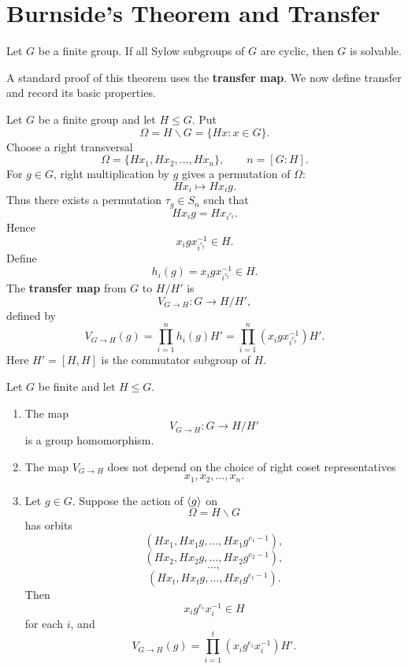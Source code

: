 \section{Burnside's Theorem and Transfer}

\begin{theorem}[Burnside]
Let $G$ be a finite group. If all Sylow subgroups of $G$ are cyclic, then $G$ is solvable.
\end{theorem}

\begin{remark}
A standard proof of this theorem uses the \textbf{transfer map}. We now define transfer and record its basic properties.
\end{remark}

\begin{definition}[Transfer]
Let $G$ be a finite group and let $H\leq G$. Put
\[
    \Omega=H\backslash G=\{Hx:x\in G\}.
\]
Choose a right transversal
\[
    \Omega=\{Hx_1,Hx_2,\ldots,Hx_n\},
    \qquad
    n=[G:H].
\]
For $g\in G$, right multiplication by $g$ gives a permutation of $\Omega$:
\[
    Hx_i\longmapsto Hx_i g.
\]
Thus there exists a permutation $\tau_g\in S_n$ such that
\[
    Hx_i g=Hx_{i^{\tau_g}}.
\]
Hence
\[
    x_i g x_{i^{\tau_g}}^{-1}\in H.
\]
Define
\[
    h_i(g)=x_i g x_{i^{\tau_g}}^{-1}\in H.
\]
The \textbf{transfer map} from $G$ to $H/H'$ is
\[
    V_{G\to H}:G\longrightarrow H/H',
\]
defined by
\[
    V_{G\to H}(g)
    =
    \prod_{i=1}^n h_i(g)H'
    =
    \prod_{i=1}^n
    \left(x_i g x_{i^{\tau_g}}^{-1}\right)H'.
\]
Here $H'=[H,H]$ is the commutator subgroup of $H$.
\end{definition}

\begin{lemma}
Let $G$ be finite and let $H\leq G$.
\begin{enumerate}[label=(\arabic*)]
    \item The map
    \[
        V_{G\to H}:G\longrightarrow H/H'
    \]
    is a group homomorphism.

    \item The map $V_{G\to H}$ does not depend on the choice of right coset representatives
    \[
        x_1,x_2,\ldots,x_n.
    \]

    \item Let $g\in G$. Suppose the action of $\langle g\rangle$ on
    \[
        \Omega=H\backslash G
    \]
    has orbits
    \[
        (Hx_1,Hx_1g,\ldots,Hx_1g^{e_1-1}),
    \]
    \[
        (Hx_2,Hx_2g,\ldots,Hx_2g^{e_2-1}),
    \]
    \[
        \ldots,
    \]
    \[
        (Hx_t,Hx_tg,\ldots,Hx_tg^{e_t-1}).
    \]
    Then
    \[
        x_i g^{e_i}x_i^{-1}\in H
    \]
    for each $i$, and
    \[
        V_{G\to H}(g)
        =
        \prod_{i=1}^t
        \left(x_i g^{e_i}x_i^{-1}\right)H'.
    \]
\end{enumerate}
\end{lemma}

